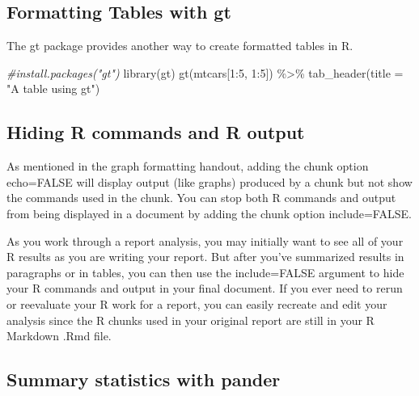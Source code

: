 \documentclass[
]{book}
\newenvironment{Shaded}{\begin{snugshade}}{\end{snugshade}}
\newcommand{\AttributeTok}[1]{\textcolor[rgb]{0.77,0.63,0.00}{#1}}
\newcommand{\CommentTok}[1]{\textcolor[rgb]{0.56,0.35,0.01}{\textit{#1}}}
\newcommand{\DecValTok}[1]{\textcolor[rgb]{0.00,0.00,0.81}{#1}}
\newcommand{\FunctionTok}[1]{\textcolor[rgb]{0.00,0.00,0.00}{#1}}
\newcommand{\NormalTok}[1]{#1}
\newcommand{\SpecialCharTok}[1]{\textcolor[rgb]{0.00,0.00,0.00}{#1}}
\newcommand{\StringTok}[1]{\textcolor[rgb]{0.31,0.60,0.02}{#1}}
\begin{document}
\hypertarget{formatting-tables-with-gt}{%
\subsection{Formatting Tables with gt}\label{formatting-tables-with-gt}}

The gt package provides another way to create formatted tables in R.

\begin{Shaded}
\begin{Highlighting}[]
\CommentTok{\#install.packages("gt")}
\FunctionTok{library}\NormalTok{(gt)}
\FunctionTok{gt}\NormalTok{(mtcars[}\DecValTok{1}\SpecialCharTok{:}\DecValTok{5}\NormalTok{, }\DecValTok{1}\SpecialCharTok{:}\DecValTok{5}\NormalTok{]) }\SpecialCharTok{\%\textgreater{}\%}
  \FunctionTok{tab\_header}\NormalTok{(}\AttributeTok{title =} \StringTok{"A table using gt"}\NormalTok{)}
\end{Highlighting}
\end{Shaded}

\hypertarget{hiding-r-commands-and-r-output}{%
\subsection{Hiding R commands and R output}\label{hiding-r-commands-and-r-output}}

As mentioned in the graph formatting handout, adding the chunk option echo=FALSE will display output (like graphs) produced by a chunk but not show the commands used in the chunk. You can stop both R commands and output from being displayed in a document by adding the chunk option include=FALSE.

As you work through a report analysis, you may initially want to see all of your R results as you are writing your report. But after you've summarized results in paragraphs or in tables, you can then use the include=FALSE argument to hide your R commands and output in your final document. If you ever need to rerun or reevaluate your R work for a report, you can easily recreate and edit your analysis since the R chunks used in your original report are still in your R Markdown .Rmd file.

\hypertarget{summary-statistics-with-pander}{%
\subsection{Summary statistics with pander}\label{summary-statistics-with-pander}}
\end{document}
